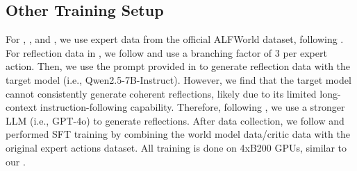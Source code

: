 \subsection{Other Training Setup}
\label{subsec:alfworld_other_setup}
For \distill{}, \IWM{}, and \ICRIT{}, we use expert data from the official ALFWorld dataset, following \citet{zhang2025agentlearningearlyexperience}.
For reflection data in \ICRIT{}, we follow \citet{zhang2025agentlearningearlyexperience} and use a branching factor of 3 per expert action.
Then, we use the prompt provided in \citet{zhang2025agentlearningearlyexperience} to generate reflection data with the target model (i.e., Qwen2.5-7B-Instruct).
However, we find that the target model cannot consistently generate coherent reflections, likely due to its limited long-context instruction-following capability. Therefore, following \citet{yu2025dynathinksynergizingreasoningacting}, we use a stronger LLM (i.e., GPT-4o) to generate reflections.
After data collection, we follow \citet{zhang2025agentlearningearlyexperience} and performed SFT training by combining the world model data/critic data with the original expert actions dataset.
All training is done on 4xB200 GPUs, similar to our \wmsftshort{}.



% 
